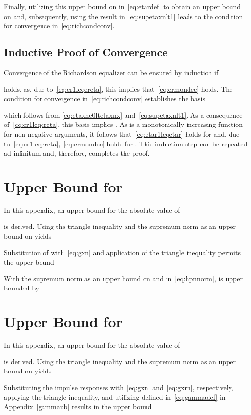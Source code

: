 \documentclass[10pt,twocolumn,twoside]{IEEEtran}
\begin{document}
Finally, utilizing this upper bound on  in~\eqref{eq:etardef} to
obtain an upper bound on  and, subsequently, using the result
in~\eqref{eq:supetaxnlt1} leads to the condition for convergence in~\eqref{eq:richcondconv}.


\subsection{Inductive Proof of Convergence}

Convergence of the Richardson equalizer can be ensured by induction if

holds, as, due to~\eqref{eq:er1leqereta}, this implies that~\eqref{eq:ermondec} holds.
The condition for convergence in~\eqref{eq:richcondconv} establishes the basis

which follows from \eqref{eq:etaxne0ltetaxnx} and~\eqref{eq:supetaxnlt1}. As a
consequence of~\eqref{eq:er1leqereta}, this basis implies .
As  is a monotonically increasing function for
non-negative arguments, it follows that~\eqref{eq:etar1leqetar} holds for 
and, due to~\eqref{eq:er1leqereta},~\eqref{eq:ermondec} holds for .
This induction step can be repeated ad infinitum and, therefore, completes the proof.


\section{Upper Bound for }
	\label{alphaub}

In this appendix, an upper bound for the absolute value of

is derived. Using the triangle inequality and the supremum norm 
as an upper bound on  yields

Substitution of  with~\eqref{eq:gxn} and application of the
triangle inequality permits the upper bound

With the supremum norm  as an upper bound on 
and  in~\eqref{eq:hpnnorm}, 
is upper bounded by



\section{Upper Bound for }
	\label{betaub}

In this appendix, an upper bound for the absolute value of

is derived. Using the triangle inequality and the supremum norm 
as an upper bound on  yields

Substituting the impulse responses with~\eqref{eq:gxn} and~\eqref{eq:gxrn}, respectively,
applying the triangle inequality, and utilizing 
defined in~\eqref{eq:gammadef} in Appendix~\ref{gammaub} results in the upper bound
\end{document}

